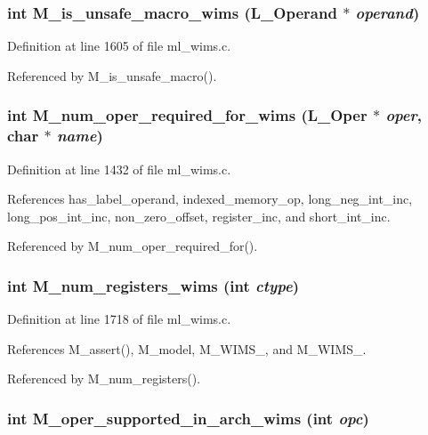 \subsubsection{\setlength{\rightskip}{0pt plus 5cm}int M\_\-is\_\-unsafe\_\-macro\_\-wims (L\_\-Operand $\ast$ {\em operand})}\label{m__wims_8h_24594990e1e6ade090136514ef713ae8}




Definition at line 1605 of file ml\_\-wims.c.

Referenced by M\_\-is\_\-unsafe\_\-macro().
\subsubsection{\setlength{\rightskip}{0pt plus 5cm}int M\_\-num\_\-oper\_\-required\_\-for\_\-wims (L\_\-Oper $\ast$ {\em oper}, char $\ast$ {\em name})}\label{m__wims_8h_70ac477eaa53977691c3857c822fd941}




Definition at line 1432 of file ml\_\-wims.c.

References has\_\-label\_\-operand, indexed\_\-memory\_\-op, long\_\-neg\_\-int\_\-inc, long\_\-pos\_\-int\_\-inc, non\_\-zero\_\-offset, register\_\-inc, and short\_\-int\_\-inc.

Referenced by M\_\-num\_\-oper\_\-required\_\-for().
\subsubsection{\setlength{\rightskip}{0pt plus 5cm}int M\_\-num\_\-registers\_\-wims (int {\em ctype})}\label{m__wims_8h_86ab7de92232fd31bc1014e5398b513b}




Definition at line 1718 of file ml\_\-wims.c.

References M\_\-assert(), M\_\-model, M\_\-WIMS\_, and M\_\-WIMS\_.

Referenced by M\_\-num\_\-registers().
\subsubsection{\setlength{\rightskip}{0pt plus 5cm}int M\_\-oper\_\-supported\_\-in\_\-arch\_\-wims (int {\em opc})}\label{m__wims_8h_f14f1f8edd6e62703b8dfc729724840a}




